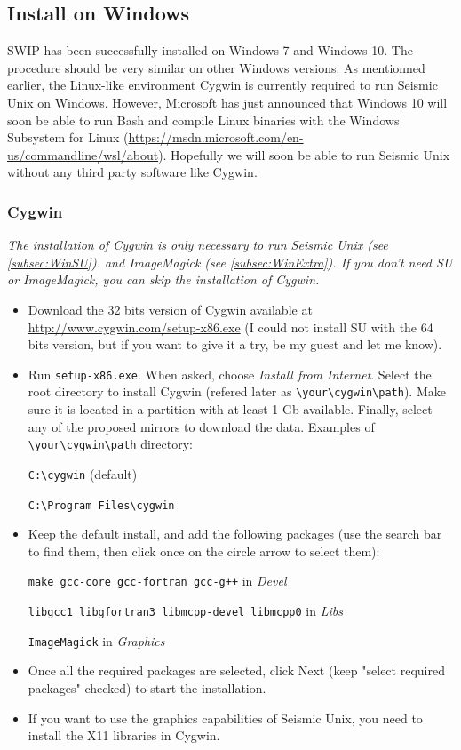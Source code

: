 \documentclass[twoside,a4paper]{article}
\begin{document}
\subsection{Install on Windows}
SWIP has been successfully installed on Windows 7 and Windows 10. The procedure should be very similar on other Windows versions. As mentionned earlier, the Linux-like environment Cygwin is currently required to run Seismic Unix on Windows. However, Microsoft has just announced that Windows 10 will soon be able to run Bash and compile Linux binaries with the Windows Subsystem for Linux (\url{https://msdn.microsoft.com/en-us/commandline/wsl/about}). Hopefully we will soon be able to run Seismic Unix without any third party software like Cygwin.

\subsubsection{Cygwin}
\textit{The installation of Cygwin is only necessary to run Seismic Unix (see \ref{subsec:WinSU}). and ImageMagick (see \ref{subsec:WinExtra}). If you don't need SU or ImageMagick, you can skip the installation of Cygwin.}
\begin{itemize}
\setlength\itemsep{2ex}
\setlength{\parindent}{5ex}
\item Download the 32 bits version of Cygwin available at \url{http://www.cygwin.com/setup-x86.exe} (I could not install SU with the 64 bits version, but if you want to give it a try, be my guest and let me know).

\item Run \verb|setup-x86.exe|. When asked, choose \textit{Install from Internet}. Select the root directory to install Cygwin (refered later as \verb|\your\cygwin\path|). Make sure it is located in a partition with at least 1 Gb available. Finally, select any of the proposed mirrors to download the data.
Examples of \verb|\your\cygwin\path| directory:

\verb|C:\cygwin| (default)

\verb|C:\Program Files\cygwin|

\item Keep the default install, and add the following packages (use the search bar to find them, then click once on the circle arrow to select them):

\verb|make gcc-core gcc-fortran gcc-g++| in \textit{Devel}

\verb|libgcc1 libgfortran3 libmcpp-devel libmcpp0| in \textit{Libs}

\verb|ImageMagick| in \textit{Graphics}

\item Once all the required packages are selected, click Next (keep "select required packages" checked) to start the installation.

\item If you want to use the graphics capabilities of Seismic Unix, you need to install the X11 libraries in Cygwin.
\end{itemize}
\end{document}
